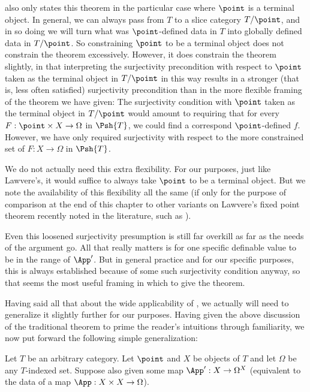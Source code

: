 \autocite{lawvere1969diagonal} also only states this theorem in the particular case where $\point$ is a terminal object. In general, we can always pass from $T$ to a slice category $T/\point$, and in so doing we will turn what was $\point$-defined data in $T$ into globally defined data in $T/\point$. So constraining $\point$ to be a terminal object does not constrain the theorem excessively. However, it does constrain the theorem slightly, in that interpreting the surjectivity precondition with respect to $\point$ taken as the terminal object in $T/\point$ in this way results in a stronger (that is, less often satisfied) surjectivity precondition than in the more flexible framing of the theorem we have given: The surjectivity condition with $\point$ taken as the terminal object in $T/\point$ would amount to requiring that for every $F : \point \times X \to \Omega$ in $\Psh{T}$, we could find a correspond $\point$-defined $f$. However, we have only required surjectivity with respect to the more constrained set of $F : X \to \Omega$ in $\Psh{T}$.

We do not actually need this extra flexibility. For our purposes, just like Lawvere's, it would suffice to always take $\point$ to be a terminal object. But we note the availability of this flexibility all the same (if only for the purpose of comparison at the end of this chapter to other variants on Lawvere's fixed point theorem recently noted in the literature, such as ).

Even this loosened surjectivity presumption is still far overkill as far as the needs of the argument go. All that really matters is for one specific definable value to be in the range of $\App'$. But in general practice and for our specific purposes, this is always established because of some such surjectivity condition anyway, so that seems the most useful framing in which to give the theorem.

Having said all that about the wide applicability of , we actually will need to generalize it slightly further for our purposes. Having given the above discussion of the traditional theorem to prime the reader's intuitions through familiarity, we now put forward the following simple generalization:

\label{SelfRelatedPointTheorem}
Let $T$ be an arbitrary category. Let $\point$ and $X$ be objects of $T$ and let $\Omega$ be any $T$-indexed set. Suppose also given some map $\App' : X \to \Omega^X$ (equivalent to the data of a map $\App : X \times X \to \Omega$).

